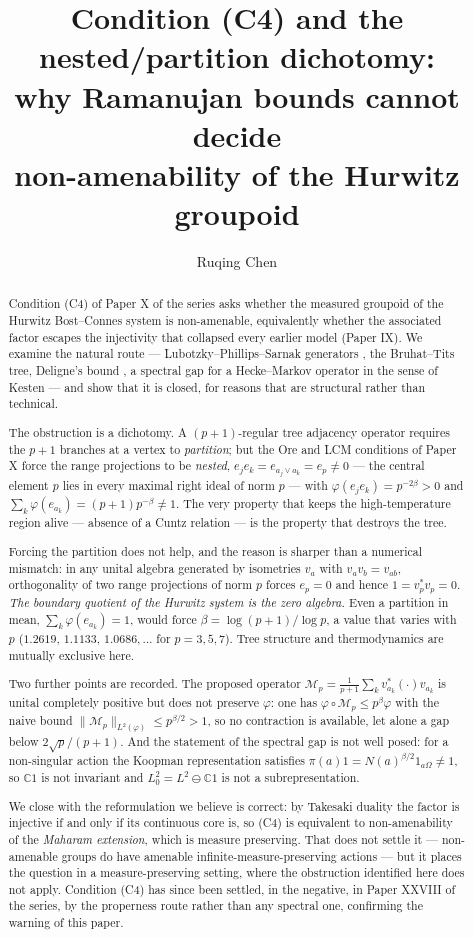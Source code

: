 \documentclass[11pt]{amsart}
\title[The Ramanujan route to (C4) is closed]{Condition \textup{(C4)} and the nested/partition dichotomy:\\ why Ramanujan bounds cannot decide\\ non-amenability of the Hurwitz groupoid}
\author{Ruqing Chen}
\date{}
\numberwithin{equation}{section}
\theoremstyle{definition}
\theoremstyle{remark}
\newcommand{\C}{\mathbb{C}}
\newcommand{\cM}{\mathcal{M}}
\begin{document}
\begin{abstract}
Condition (C4) of Paper X of the series asks whether the measured groupoid of the Hurwitz
Bost--Connes system is non-amenable, equivalently whether the associated factor escapes the
injectivity that collapsed every earlier model (Paper IX). We examine the natural route ---
Lubotzky--Phillips--Sarnak generators \cite{LPS}, the Bruhat--Tits tree, Deligne's bound
\cite{Deligne}, a spectral gap for a Hecke--Markov operator in the sense of Kesten
\cite{Kesten} --- and show that it is closed, for reasons that are structural rather than
technical.

The obstruction is a dichotomy. A $(p+1)$-regular tree adjacency operator requires the $p+1$
branches at a vertex to \emph{partition}; but the Ore and LCM conditions of Paper X force
the range projections to be \emph{nested}, $e_je_k=e_{a_j\vee a_k}=e_p\ne0$ --- the central
element $p$ lies in every maximal right ideal of norm $p$ --- with $\varphi(e_je_k)=p^{-2\beta}>0$
and $\sum_k\varphi(e_{a_k})=(p+1)p^{-\beta}\ne1$. The very property that keeps the
high-temperature region alive --- absence of a Cuntz relation --- is the property that
destroys the tree.

Forcing the partition does not help, and the reason is sharper than a numerical mismatch: in
any unital algebra generated by isometries $v_a$ with $v_av_b=v_{ab}$, orthogonality of two
range projections of norm $p$ forces $e_p=0$ and hence $1=v_p^*v_p=0$. \emph{The boundary
quotient of the Hurwitz system is the zero algebra.} Even a partition in mean,
$\sum_k\varphi(e_{a_k})=1$, would force $\beta=\log(p+1)/\log p$, a value that varies with $p$
($1.2619,\,1.1133,\,1.0686,\dots$ for $p=3,5,7$). Tree structure and thermodynamics are
mutually exclusive here.

Two further points are recorded. The proposed operator
$\cM_p=\frac{1}{p+1}\sum_kv_{a_k}^*(\cdot)v_{a_k}$ is unital completely positive but does not
preserve $\varphi$: one has $\varphi\circ\cM_p\le p^{\beta}\varphi$ with the naive bound
$\|\cM_p\|_{L^2(\varphi)}\le p^{\beta/2}>1$, so no contraction is available, let alone a gap
below $2\sqrt p/(p+1)$. And the statement of the spectral gap is not well posed: for a
non-singular action the Koopman representation satisfies $\pi(a)1=N(a)^{\beta/2}1_{a\Omega}\ne1$,
so $\C1$ is not invariant and $L^2_0=L^2\ominus\C1$ is not a subrepresentation.

We close with the reformulation we believe is correct: by Takesaki duality the factor is
injective if and only if its continuous core is, so (C4) is equivalent to non-amenability of
the \emph{Maharam extension}, which is measure preserving. That does not settle it --- non-amenable groups do have
amenable infinite-measure-preserving actions --- but it places the question in a
measure-preserving setting, where the obstruction identified here does not apply.
Condition (C4) has since been settled, in the negative, in Paper XXVIII of the series,
by the properness route rather than any spectral one, confirming the warning of this paper.
\end{abstract}
\end{document}
